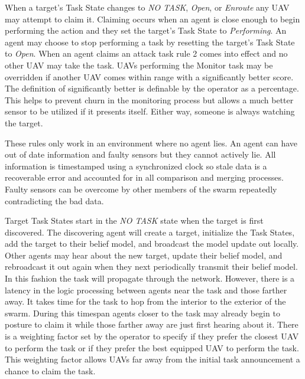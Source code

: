 When a target's Task State changes to \textit{NO TASK}, \textit{Open}, or \textit{Enroute} any UAV may attempt to claim it.  Claiming occurs when an agent is close enough to begin performing the action and they set the target's Task State to \textit{Performing}.  An agent may choose to stop performing a task by resetting the target's Task State to \textit{Open}.  When an agent claims an attack task rule 2 comes into effect and no other UAV may take the task.  UAVs performing the Monitor task may be overridden if another UAV comes within range with a significantly better score.  The definition of significantly better is definable by the operator as a percentage.   This helps to prevent churn in the monitoring process but allows a much better sensor to be utilized if it presents itself.  Either way, someone is always watching the target.

These rules only work in an environment where no agent lies.  An agent can have out of date information and faulty sensors but they cannot actively lie.  All information is timestamped using a synchronized clock so stale data is a recoverable error and accounted for in all comparison and merging processes.  Faulty sensors can be overcome by other members of the swarm repeatedly contradicting the bad data.

Target Task States start in the \textit{NO TASK} state when the target is first discovered.  The discovering agent will create a target, initialize the Task States,  add the target to their belief model, and broadcast the model update out locally.  Other agents may hear about the new target, update their belief model, and rebroadcast it out again when they next periodically transmit their belief model.  In this fashion the task will propagate through the network.  However, there is a latency in the logic processing between agents near the task and those farther away.  It takes time for the task to hop from the interior to the exterior of the swarm.  During this timespan agents closer to the task may already begin to posture to claim it while those farther away are just first hearing about it.  There is a weighting factor set by the operator to specify if they prefer the closest UAV to perform the task or if they prefer the best equipped UAV to perform the task.  This weighting factor allows UAVs far away from the initial task announcement a chance to claim the task.

